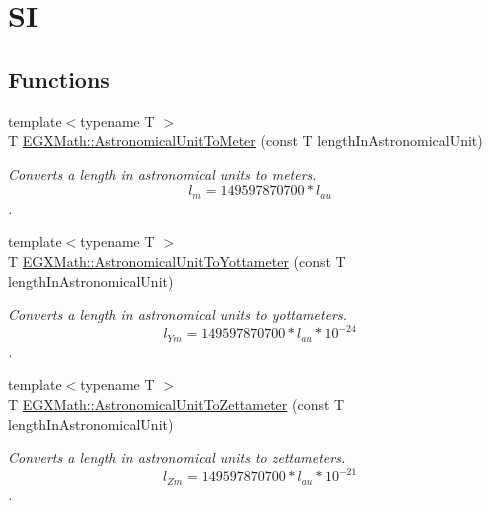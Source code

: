 \hypertarget{group___e_g_x_math-_conversions-_length_conversions-_astronomical-_astronomical_unit-_s_i}{}\section{SI}
\label{group___e_g_x_math-_conversions-_length_conversions-_astronomical-_astronomical_unit-_s_i}
\subsection*{Functions}
\begin{DoxyCompactItemize}
\item 
{\footnotesize template$<$typename T $>$ }\\T \mbox{\hyperlink{group___e_g_x_math-_conversions-_length_conversions-_astronomical-_astronomical_unit-_s_i_gafa85cf1b3dc583681c13501fa9d923ff}{E\+G\+X\+Math\+::\+Astronomical\+Unit\+To\+Meter}} (const T length\+In\+Astronomical\+Unit)
\begin{DoxyCompactList}\small\item\em Converts a length in astronomical units to meters. \[ l_{m}=149597870700 * l_{au} \]. \end{DoxyCompactList}\item 
{\footnotesize template$<$typename T $>$ }\\T \mbox{\hyperlink{group___e_g_x_math-_conversions-_length_conversions-_astronomical-_astronomical_unit-_s_i_ga4cb2d4b1c5fef83c15a4737cef4b22e2}{E\+G\+X\+Math\+::\+Astronomical\+Unit\+To\+Yottameter}} (const T length\+In\+Astronomical\+Unit)
\begin{DoxyCompactList}\small\item\em Converts a length in astronomical units to yottameters. \[ l_{Ym}=149597870700 * l_{au} * 10^{-24} \]. \end{DoxyCompactList}\item 
{\footnotesize template$<$typename T $>$ }\\T \mbox{\hyperlink{group___e_g_x_math-_conversions-_length_conversions-_astronomical-_astronomical_unit-_s_i_ga7fcac45015ba20b9dd52b328ddb29ed9}{E\+G\+X\+Math\+::\+Astronomical\+Unit\+To\+Zettameter}} (const T length\+In\+Astronomical\+Unit)
\begin{DoxyCompactList}\small\item\em Converts a length in astronomical units to zettameters. \[ l_{Zm}=149597870700 * l_{au} * 10^{-21} \]. \end{DoxyCompactList}\item 

\end{DoxyCompactItemize}
